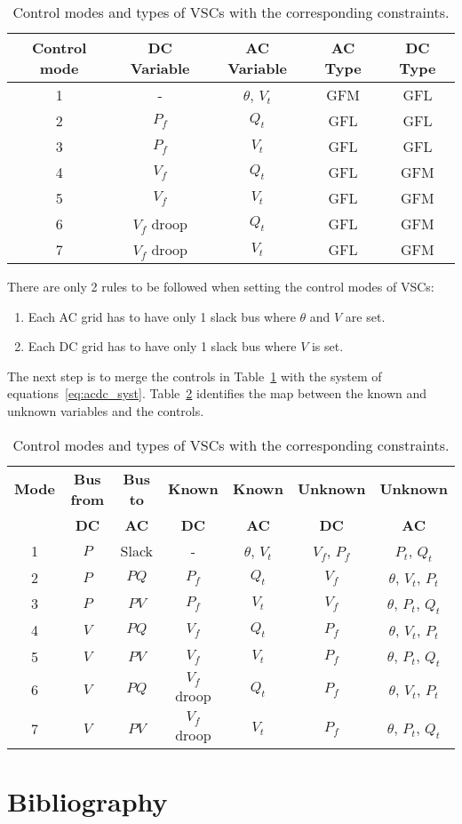 \documentclass[11pt]{article}
\begin{document}
	\begin{table}[!htb]\centering
		\caption{Control modes and types of VSCs with the corresponding constraints.}
		\begin{tabular}{ccccc}
			\hline
			\textbf{Control mode} & \textbf{DC Variable} & \textbf{AC Variable} & \textbf{AC Type} & \textbf{DC Type} \\
			\hline
			1 & - & $\theta$, $V_t$ & GFM & GFL \\
			2 & $P_f$ & $Q_t$ & GFL & GFL \\
			3 & $P_f$ & $V_t$ & GFL & GFL \\
			4 & $V_f$ & $Q_t$ & GFL & GFM \\
			5 & $V_f$ & $V_t$ & GFL & GFM \\
			6 & $V_f$ droop & $Q_t$ & GFL & GFM \\
			7 & $V_f$ droop & $V_t$ & GFL & GFM \\
			\hline
		\end{tabular}
		\label{table:contr_vsc}
	\end{table}

	There are only 2 rules to be followed when setting the control modes of VSCs:
	\begin{enumerate}
		\item Each AC grid has to have only 1 slack bus where $\theta$ and $V$ are set.
		\item Each DC grid has to have only 1 slack bus where $V$ is set.
	\end{enumerate}
	The next step is to merge the controls in Table~\ref{table:contr_vsc} with the system of equations~\eqref{eq:acdc_syst}. Table~\ref{table:vsc_map} identifies the map between the known and unknown variables and the controls.

	\begin{table}[!htb]\centering
		\caption{Control modes and types of VSCs with the corresponding constraints.}
		\begin{tabular}{ccccccc}
			\hline
			\textbf{Mode} & \textbf{Bus from} & \textbf{Bus to} & \textbf{Known} & \textbf{Known} & \textbf{Unknown} & \textbf{Unknown} \\
			\textbf{} & \textbf{DC} & \textbf{AC} & \textbf{DC} & \textbf{AC} & \textbf{DC} & \textbf{AC} \\
			\hline
			1 & $P$ & Slack & - & $\theta$, $V_t$ & $V_f$, $P_f$ & $P_t$, $Q_t$ \\
			2 & $P$ & $PQ$ & $P_f$ & $Q_t$ & $V_f$ & $\theta$, $V_t$, $P_t$ \\
			3 & $P$ & $PV$ & $P_f$ & $V_t$ & $V_f$ & $\theta$, $P_t$, $Q_t$ \\
			4 & $V$ & $PQ$ & $V_f$ & $Q_t$ & $P_f$ & $\theta$, $V_t$, $P_t$ \\
			5 & $V$ & $PV$ & $V_f$ & $V_t$ & $P_f$ & $\theta$, $P_t$, $Q_t$ \\
			6 & $V$ & $PQ$ & $V_f$ droop & $Q_t$ & $P_f$ & $\theta$, $V_t$, $P_t$ \\
			7 & $V$ & $PV$ & $V_f$ droop & $V_t$ & $P_f$ & $\theta$, $P_t$, $Q_t$ \\
			\hline
		\end{tabular}
		\label{table:vsc_map}
	\end{table}



	
	\section{Bibliography}
	\printbibliography
	
\end{document}
